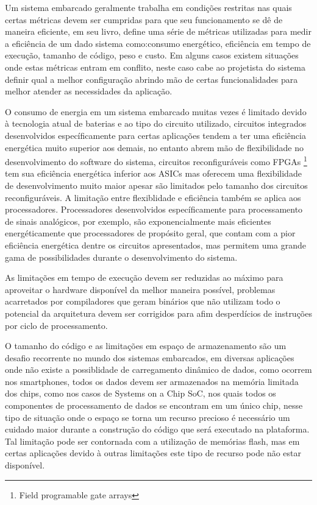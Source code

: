 Um sistema embarcado geralmente trabalha em condições restritas nas quais certas métricas devem ser cumpridas para que seu funcionamento se dê de maneira eficiente, em seu livro, \cite{marwedel:2011} define uma série de métricas utilizadas para medir a eficiência de um dado sistema como:consumo energético, eficiência em tempo de execução, tamanho de código, peso e custo. Em alguns casos existem situações onde estas métricas entram em conflito, neste caso cabe ao projetista do sistema definir qual a melhor configuração abrindo mão de certas funcionalidades para melhor atender as necessidades da aplicação.

O consumo de energia em um sistema embarcado muitas vezes é limitado devido à tecnologia atual de baterias e ao tipo do circuito utilizado, circuitos integrados desenvolvidos específicamente para certas aplicações tendem a ter uma eficiência energética muito superior aos demais, no entanto abrem mão de flexibilidade no desenvolvimento do software do sistema, circuitos reconfiguráveis como FPGAs \footnote{Field programable gate arrays} tem sua eficiência energética inferior aos ASICs mas oferecem uma flexibilidade de desenvolvimento muito maior apesar são limitados pelo tamanho dos circuitos reconfiguráveis. A limitação entre flexiblidade e eficiência também se aplica aos processadores. Processadores desenvolvidos específicamente para processamento de sinais analógicos, por exemplo, são exponencialmente mais eficientes energéticamente que processadores de propósito geral, que contam com a pior eficiência energética dentre os circuitos apresentados, mas permitem uma grande gama de possibilidades durante o desenvolvimento do sistema.

As limitações em tempo de execução devem ser reduzidas ao máximo para aproveitar o hardware disponível da melhor maneira possível, problemas acarretados por compiladores que geram binários que não utilizam todo o potencial da arquitetura devem ser corrigidos para afim desperdícios de instruções por ciclo de processamento.

O tamanho do código e as limitações em espaço de armazenamento são um desafio recorrente no mundo dos sistemas embarcados, em diversas aplicações onde não existe a possiblidade de carregamento dinâmico de dados, como ocorrem nos smartphones, todos os dados devem ser armazenados na memória limitada dos chips, como nos casos de Systems on a Chip SoC, nos quais todos os componentes de processamento de dados se encontram em um único chip, nesse tipo de situação onde o espaço se torna um recurso precioso é necessário um cuidado maior durante a construção do código que será executado na plataforma. Tal limitação pode ser contornada com a utilização de memórias flash, mas em certas aplicações devido à outras limitações este tipo de recurso pode não estar disponível.

